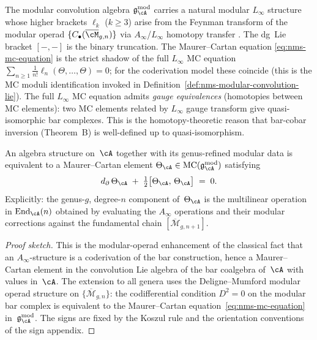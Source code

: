 \begin{remark}
\label{rem:nms-linfty-enrichment}
The modular convolution algebra $\gAmod$ carries a natural modular
$L_\infty$ structure whose higher brackets $\ell_k$ ($k \geq 3$)
arise from the Feynman transform of the modular operad
$\{C_\bullet(\overline{\cM}_{g,n})\}$ via $A_\infty$/$L_\infty$
homotopy transfer \cite[\S10.3]{LV12}. The dg~Lie bracket $[-,-]$
is the binary truncation. The Maurer--Cartan equation
\eqref{eq:nms-mc-equation} is the strict shadow of the full $L_\infty$
MC equation $\sum_{n \geq 1} \frac{1}{n!}\ell_n(\Theta,\ldots,\Theta) = 0$;
for the coderivation model these coincide (this is
the MC moduli identification invoked in
Definition~\ref{def:nms-modular-convolution-lie}).
The full $L_\infty$ MC equation admits \emph{gauge equivalences} (homotopies between MC elements):
two MC elements related by $L_\infty$ gauge transform give
quasi-isomorphic bar complexes. This is the homotopy-theoretic reason
that bar-cobar inversion (Theorem~B) is well-defined up to
quasi-isomorphism.
\end{remark}

\begin{theorem}[Algebra structure $=$ Maurer--Cartan element; \ClaimStatusProvedHere]
\label{thm:nms-mc-principle}%
%
%
An algebra structure on~$\cA$ together with its genus-refined modular data
is equivalent to a Maurer--Cartan element
$\Theta_{\cA} \in \mathrm{MC}(\gAmod)$ satisfying
\begin{equation}\label{eq:nms-mc-equation}
 d_\partial\,\Theta_{\cA}
 \;+\;
 \tfrac{1}{2}\bigl[\Theta_{\cA},\,\Theta_{\cA}\bigr]
 \;=\; 0.
\end{equation}
Explicitly: the genus-$g$, degree-$n$ component of~$\Theta_{\cA}$ is
the multilinear operation in $\operatorname{End}_{\cA}(n)$ obtained by
evaluating the $A_\infty$ operations and their modular corrections
against the fundamental chain
$[{}\overline{\mathcal{M}}_{g,n+1}]$.
\end{theorem}

\begin{proof}[Proof sketch]
This is the modular-operad enhancement of the classical fact that an
$A_\infty$-structure is a coderivation of the bar construction, hence
a Maurer--Cartan element in the convolution Lie algebra of the bar
coalgebra of~$\cA$ with values in~$\cA$. The extension to all genera
uses the Deligne--Mumford modular operad structure on
$\{\overline{\mathcal{M}}_{g,n}\}$: the codifferential condition
$D^2=0$ on the modular bar complex is equivalent to the
Maurer--Cartan equation~\eqref{eq:nms-mc-equation} in~$\gAmod$.
The signs are fixed by the Koszul rule and the orientation conventions
of the sign appendix.
\end{proof}

